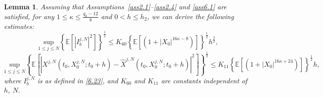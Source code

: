 \documentclass[12pt]{article}
\numberwithin{equation}{section}
\newtheorem{lemma}[assumption]{Lemma}
\begin{document}
\begin{lemma}\label{lemma6.7}
    Assuming that Assumptions~\ref{ass2.1}--\ref{ass2.4} and \ref{ass6.1} are satisfied, for any $1 \leq \kappa \leq \tfrac{q_0 - 12}{8}$ and $0 < h \leq h_2$, we can derive the following estimates:
\begin{equation}\tag{5.135}\label{6.38}
\underset{1\leqslant j\leqslant N}{\mathrm{sup}}\left\{ \mathbb{E} \left[ \left| I_{b}^{j,N} \right|^2 \right] \right\} ^{\frac{1}{2}}\le K_{60}\left\{ \mathbb{E} \left[ \left(1+\left|X_0\right|^{16\kappa -8} \right)\right] \right\} ^{\frac{1}{2}}h^{\frac{3}{2}},
\end{equation}
\begin{equation}\tag{5.136}\label{6.39}
\underset{1\leqslant j\leqslant N}{\mathrm{sup}}\left\{ \mathbb{E} \left[ \left|X^{j,N}\left( t_0,X^{j,N}_0;t_0+h \right) -\hat{X}^{j,N}\left( t_0,X^{j,N}_0;t_0+h \right)\right |^2 \right] \right\} ^{\frac{1}{2}}\le K_{11}\left\{ \mathbb{E} \left[ \left(1+\left|X_0\right|^{16\kappa +24}\right) \right] \right\} ^{\frac{1}{2}}h,
\end{equation}
where $I_b^{j,N}$ is as defined in \eqref{6.23}, and $K_{60}$ and $K_{11}$ are constants independent of $h$, $N$.
\end{lemma}
\end{document}
